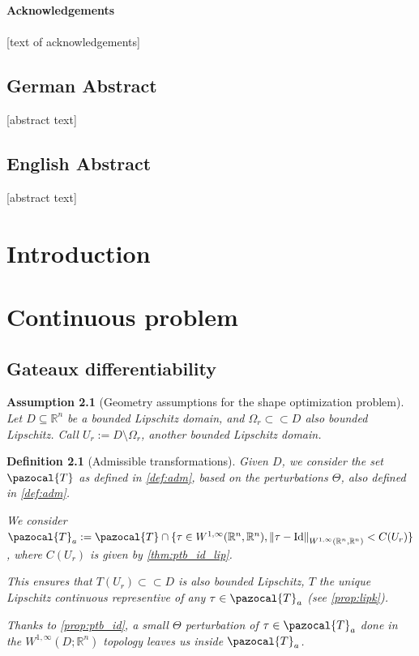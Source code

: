 \documentclass[english,a4paper,10pt,oneside]{scrbook}	%
\theoremstyle{break}
\newtheorem{defn}[equation]{Definition}
\newtheorem{ass}[equation]{Assumption}
\theoremstyle{remark}
\newcommand{\mR}{\mathbb{R}}
\newcommand{\norm}[1]{\left\lVert#1\right\rVert}
\newcommand{\cc}{\subset\subset}
\newcommand{\cT}{\pazocal{T}}
\newcommand{\id}{\text{Id}}
\newcommand{\Te}{\Theta}
\begin{document}
\vspace*{2.2cm}
\noindent %
{\Huge \textbf{Acknowledgements}} \\
\vspace*{1.6cm} \\
\pagestyle{headings}
[text of acknowledgements]

\newpage
\section*{German Abstract}
[abstract text]
\section*{English Abstract}
[abstract text]
\newpage
\tableofcontents  


\chapter{Introduction}  \setcounter{page}{1}   %

\chapter{Continuous problem}
\label{chap:cts_shape_opt}

\section{Gateaux differentiability}

\begin{ass}[Geometry assumptions for the shape optimization problem]
\label{ass:geo_sh}
Let $D\subseteq \mR^n$ be a bounded Lipschitz domain, and $\Omega_r \cc D$ also bounded Lipschitz. Call $U_r:=D\setminus \Omega_r$, another bounded Lipschitz domain.
\end{ass}

\begin{defn}[Admissible transformations]

Given $D$, we consider the set $\cT$ as defined in \cref{def:adm}, based on the perturbations $\Te$, also defined in \cref{def:adm}.

We consider $\cT_a:=\cT \cap \{ \tau \in W^{1,\infty}(\mR^n, \mR^n), \norm{\tau - \id}_{W^{1,\infty}(\mR^n, \mR^n)}<C(U_r)\}$, where $C(U_r)$ is given by \cref{thm:ptb_id_lip}.

This ensures that $T(U_r)\cc D$ is also bounded Lipschitz, $T$ the unique Lipschitz continuous representive of any $\tau \in \cT_a$ (see \cref{prop:lipk}).

Thanks to \cref{prop:ptb_id}, a small $\Te$ perturbation of $\tau \in \cT_a$ done in the $W^{1,\infty}(D;\mR^n)$ topology leaves us inside $\cT_a$.

\end{defn}
\end{document}
